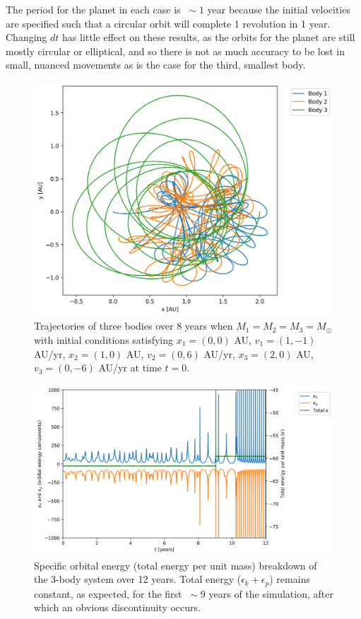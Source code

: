 \documentclass{article}
\begin{document}
The period for the planet in each case is $\ \sim 1$ year because the initial velocities are specified such that a circular orbit will complete 1 revolution in 1 year. Changing $dt$ has little effect on these results, as the orbits for the planet are still mostly circular or elliptical, and so there is not as much accuracy to be lost in small, nuanced movements as is the case for the third, smallest body.

\bigskip
{}
\medskip

\begin{figure}[H]
    \centering
    \includegraphics[width=5.5in]{homework4/p2_CM_scaled.png}
    \caption{Trajectories of three bodies over 8 years when $M_1=M_2=M_3=M_\odot$ with initial conditions satisfying $x_1 = (0,0)$ AU, $v_1 = (1,−1)$ AU/yr, $x_2 = (1,0)$ AU, $v_2 = (0,6)$ AU/yr, $x_3 = (2,0)$ AU, $v_3 = (0,−6)$ AU/yr at time $t=0$.}
    \label{fig:p2_orbits}
\end{figure}

\begin{figure}[H]
    \centering
    \includegraphics[width=5.5in]{homework4/q2_energy.png}
    \caption{Specific orbital energy (total energy per unit mass) breakdown of the 3-body system over 12 years. Total energy ($\epsilon_k + \epsilon_p$) remains constant, as expected, for the first $\ \sim 9$ years of the simulation, after which an obvious discontinuity occurs.}
    \label{fig:p2_energy}
\end{figure}
\end{document}
